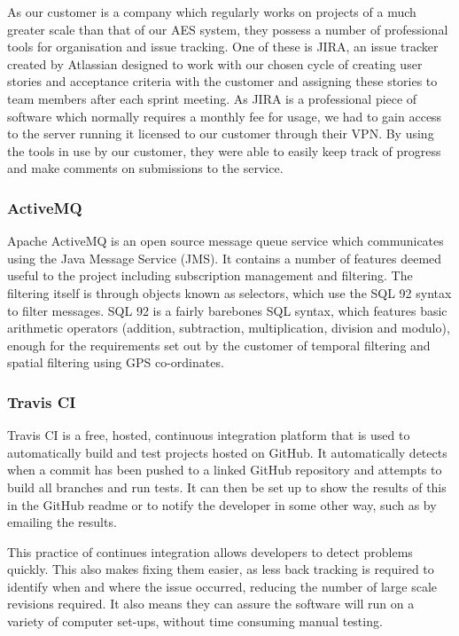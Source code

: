 \documentclass[a4paper, 12pt]{article}
\begin{document}
As our customer is a company which regularly works on projects of a much greater scale than that of our AES system, they possess a number of professional tools for organisation and issue tracking. One of these is JIRA, an issue tracker created by Atlassian designed to work with our chosen cycle of creating user stories and acceptance criteria with the customer and assigning these stories to team members after each sprint meeting. As JIRA is a professional piece of software which normally requires a monthly fee for usage, we had to gain access to the server running it licensed to our customer through their VPN. By using the tools in use by our customer, they were able to easily keep track of progress and make comments on submissions to the service.

\subsubsection{ActiveMQ}

Apache ActiveMQ is an open source message queue service which communicates using the Java Message Service (JMS). It contains a number of features deemed useful to the project including subscription management and filtering. The filtering itself is through objects known as selectors, which use the SQL 92 syntax to filter messages. SQL 92 is a fairly barebones SQL syntax, which features basic arithmetic operators (addition, subtraction, multiplication, division and modulo), enough for the requirements set out by the customer of temporal filtering and spatial filtering using GPS co-ordinates.

\subsubsection{Travis CI}

Travis CI is a free, hosted, continuous integration platform that is used to automatically build and test projects hosted on GitHub. It automatically detects when a commit has been pushed to a linked GitHub repository and attempts to build all branches and run tests. It can then be set up to show the results of this in the GitHub readme or to notify the developer in some other way, such as by emailing the results.

This practice of continues integration allows developers to detect problems quickly. This also makes fixing them easier, as less back tracking is required to identify when and where the issue occurred, reducing the number of large scale revisions required. It also means they can assure the software will run on a variety of computer set-ups, without time consuming manual testing.
\end{document}
